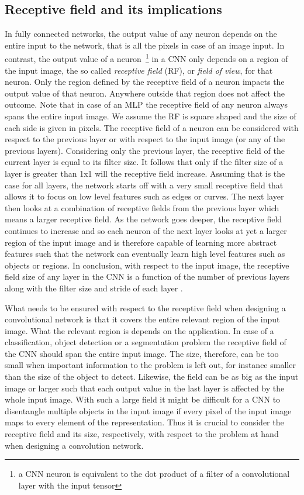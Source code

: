 \documentclass[a4paper,12pt]{report}
\begin{document}
\subsection{Receptive field and its implications}\label{sec:rf}
In fully connected networks, the output value of any neuron depends on the entire input to the network, that is all the pixels in case of an image input. In contrast, the output value of a neuron~\footnote{a CNN neuron is equivalent to the dot product of a filter of a convolutional layer with the input tensor} in a CNN only depends on a region of the input image, the so called \textit{receptive field} (RF), or \textit{field of view}, for that neuron. Only the region defined by the receptive field of a neuron impacts the output value of that neuron. Anywhere outside that region does not affect the outcome. Note that in case of an MLP the receptive field of any neuron always spans the entire input image. We assume the RF is square shaped and the size of each side is given in pixels. The receptive field of a neuron can be considered with respect to the previous layer or with respect to the input image (or any of the previous layers). Considering only the previous layer, the receptive field of the current layer is equal to its filter size. It follows that only if the filter size of a layer is greater than 1x1 will the receptive field increase. Assuming that is the case for all layers, the network starts off with a very small receptive field that allows it to focus on low level features such as edges or curves. The next layer then looks at a combination of receptive fields from the previous layer which means a larger receptive field. As the network goes deeper, the receptive field continues to increase and so each neuron of the next layer looks at yet a larger region of the input image and is therefore capable of learning more abstract features such that the network can eventually learn high level features such as objects or regions. In conclusion, with respect to the input image, the receptive field size of any layer in the CNN is a function of the number of previous layers along with the filter size and stride of each layer \cite{li_recept_field_2017}.

What needs to be ensured with respect to the receptive field when designing a convolutional network is that it covers the entire relevant region of the input image. What the relevant region is depends on the application.
In case of a classification, object detection or a segmentation problem the receptive field of the CNN should span the entire input image.  The size, therefore, can be too small when important information to the problem is left out, for instance smaller than the size of the object to detect. Likewise, the field can be as big as the input image or larger such that each output value in the last layer is affected by the whole input image. With such a large field it might be difficult for a CNN to disentangle multiple objects in the input image if every pixel of the input image maps to every element of the representation. Thus it is crucial to consider the receptive field and its size, respectively, with respect to the problem at hand when designing a convolution network.
\end{document}
